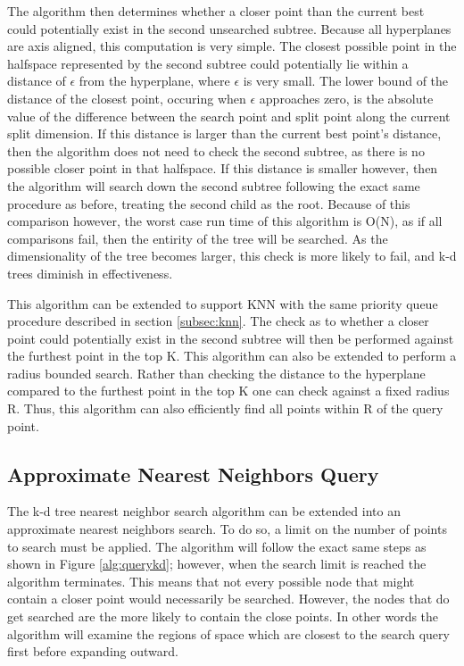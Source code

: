 The algorithm then determines whether a closer point than the current best could potentially exist in the second unsearched subtree.  Because all hyperplanes are axis aligned, this computation is very simple.  The closest possible point in the halfspace represented by the second subtree could potentially lie within a distance of $\epsilon$ from the hyperplane, where $\epsilon$ is very small.  The lower bound of the distance of the closest point, occuring when $\epsilon$ approaches zero, is the absolute value of the difference between the search point and split point along the current split dimension.  If this distance is larger than the current best point's distance, then the algorithm does not need to check the second subtree, as there is no possible closer point in that halfspace.  If this distance is smaller however, then the algorithm will search down the second subtree following the exact same procedure as before, treating the second child as the root.  Because of this comparison however, the worst case run time of this algorithm is O(N), as if all comparisons fail, then the entirity of the tree will be searched.  As the dimensionality of the tree becomes larger, this check is more likely to fail, and k-d trees diminish in effectiveness.

This algorithm can be extended to support KNN with the same priority queue procedure described in section \ref{subsec:knn}.  The check as to whether a closer point could potentially exist in the second subtree will then be performed against the furthest point in the top K.  This algorithm can also be extended to perform a radius bounded search.  Rather than checking the distance to the hyperplane compared to the furthest point in the top K one can check against a fixed radius R.  Thus, this algorithm can also efficiently find all points within R of the query point.

\subsection{Approximate Nearest Neighbors Query}

The k-d tree nearest neighbor search algorithm can be extended into an approximate nearest neighbors search.  To do so, a limit on the number of points to search must be applied.  The algorithm will follow the exact same steps as shown in Figure \ref{alg:querykd}; however, when the search limit is reached the algorithm terminates.  This means that not every possible node that might contain a closer point would necessarily be searched.  However, the nodes that do get searched are the more likely to contain the close points.  In other words the algorithm will examine the regions of space which are closest to the search query first before expanding outward.

